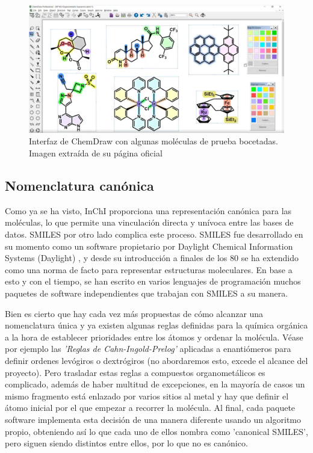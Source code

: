 \begin{figure}[h!]
    \centering
    \includegraphics[scale=0.34]{imagenes/estado_arte/chemdraw.png}
    \caption{Interfaz de ChemDraw con algunas moléculas de prueba bocetadas. Imagen extraída de su página oficial \cite{chemdraw_page}}
    \label{fig:chemdraw}
\end{figure}

\subsection{Nomenclatura canónica}
Como ya se ha visto, InChI proporciona una representación canónica para las moléculas, lo que permite una vinculación directa y unívoca entre las bases de datos. SMILES por otro lado complica este proceso. SMILES fue desarrollado en su momento como un software propietario por Daylight Chemical Information Systems (Daylight) \cite{daylight}, y desde su introducción a finales de los 80 se ha extendido como una norma de facto para representar estructuras moleculares. En base a esto y con el tiempo, se han escrito en varios lenguajes de programación muchos paquetes de software independientes que trabajan con SMILES a su manera\cite{opensmiles}.

Bien es cierto que hay cada vez más propuestas de cómo alcanzar una nomenclatura única \cite{weininger_smiles_1989, inchi1, nextmove_software_facto_nodate, baoilleach_we_nodate, universal_smiles} y ya existen algunas reglas definidas para la química orgánica a la hora de establecer prioridades entre los átomos y ordenar la molécula. Véase por ejemplo las \emph{'Reglas de Cahn-Ingold-Prelog'} aplicadas a enantiómeros \cite{cahn_specification_1966, prelog_basic_1982, NOMENCLATURA_R_S} para definir ordenes levógiros o dextrógiros (no abordaremos esto, excede el alcance del proyecto). Pero trasladar estas reglas a compuestos organometálicos es complicado, además de haber multitud de excepciones, en la mayoría de casos un mismo fragmento está enlazado por varios sitios al metal y hay que definir el átomo inicial por el que empezar a recorrer la molécula. Al final, cada paquete software implementa esta decisión de una manera diferente usando un algoritmo propio, obteniendo así lo que cada uno de ellos nombra como 'canonical SMILES', pero siguen siendo distintos entre ellos, por lo que no es canónico.

